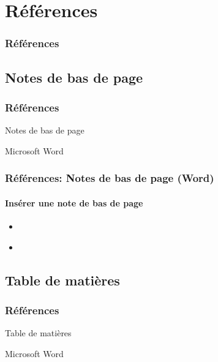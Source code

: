 \documentclass[xcolor=table]{beamer}
\begin{document}
\section{Références}

\begin{frame}
\frametitle{Références}

\end{frame}

\subsection{Notes de bas de page}

\begin{frame}
\frametitle{Références}

\begin{center}
	Notes de bas de page 
	
	Microsoft Word
\end{center}

\end{frame}

\begin{frame}[t]
\frametitle{Références: Notes de bas de page (Word)}
\framesubtitle{Insérer une note de bas de page}

\begin{minipage}{0.69\textwidth}
	\begin{itemize}
		\item 
	\end{itemize}
\end{minipage}
\begin{minipage}{0.30\textwidth}
\end{minipage}

\begin{itemize}
	\item 
\end{itemize}

\end{frame}

\subsection{Table de matières}

\begin{frame}
\frametitle{Références}

\begin{center}
	Table de matières 
	
	Microsoft Word
\end{center}

\end{frame}
\end{document}
